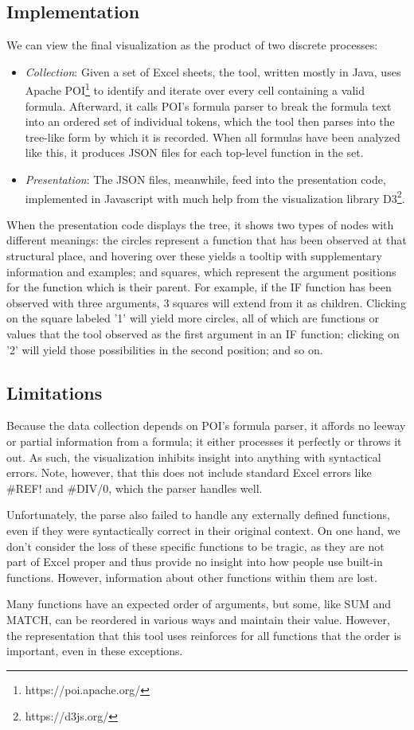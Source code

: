 \documentclass[conference]{IEEEtran}
\begin{document}
\subsection{Implementation}
We can view the final visualization as the product of two discrete processes:
\begin{itemize}
	\item \textit{Collection}: Given a set of Excel sheets, the tool, written mostly in Java, uses Apache POI\footnote{https://poi.apache.org/} to identify and iterate over every cell containing a valid formula. Afterward, it calls POI's formula parser to break the formula text into an ordered set of individual tokens, which the tool then parses into the tree-like form by which it is recorded. When all formulas have been analyzed like this, it produces JSON files for each top-level function in the set.
	\item \textit{Presentation}: The JSON files, meanwhile, feed into the presentation code, implemented in Javascript with much help from the visualization library D3\footnote{https://d3js.org/}. 
\end{itemize}
When the presentation code displays the tree, it shows two types of nodes with different meanings: the circles represent a function that has been observed at that structural place, and hovering over these yields a tooltip with supplementary information and examples; and squares, which represent the argument positions for the function which is their parent. For example, if the IF function has been observed with three arguments, 3 squares will extend from it as children. Clicking on the square labeled '1' will yield more circles, all of which are functions or values that the tool observed as the first argument in an IF function; clicking on '2' will yield those possibilities in the second position; and so on.



\subsection{Limitations}
Because the data collection depends on POI's formula parser, it affords no leeway or partial information from a formula; it either processes it perfectly or throws it out. As such, the visualization inhibits insight into anything with syntactical errors. Note, however, that this does not include standard Excel errors like \#REF! and \#DIV/0, which the parser handles well. \par
Unfortunately, the parse also failed to handle any externally defined functions, even if they were syntactically correct in their original context. On one hand, we don't consider the loss of these specific functions to be tragic, as they are not part of Excel proper and thus provide no insight into how people use built-in functions. However, information about other functions within them are lost. \par
Many functions have an expected order of arguments, but some, like SUM and MATCH, can be reordered in various ways and maintain their value. However, the representation that this tool uses reinforces for all functions that the order is important, even in these exceptions. \par
\end{document}
